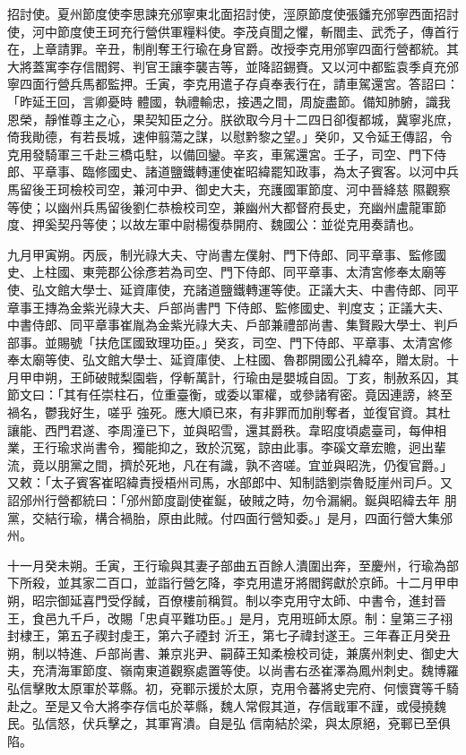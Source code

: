 \begin{pinyinscope}
 招討使。夏州節度使李思諫充邠寧東北面招討使，涇原節度使張鐇充邠寧西面招討使，河中節度使王珂充行營供軍糧料使。李茂貞聞之懼，斬閻圭、武禿子，傳首行在，上章請罪。辛丑，制削奪王行瑜在身官爵。改授李克用邠寧四面行營都統。其大將蓋寓李存信閻鍔、判官王讓李襲吉等，並降詔錫賚。又以河中都監袁季貞充邠寧四面行營兵馬都監押。壬寅，李克用遣子存貞奉表行在，請車駕還宮。答詔曰：「昨延王回，言卿憂時
 體國，執禮輸忠，接遇之間，周旋盡節。備知肺腑，識我恩榮，靜惟尊主之心，果契知臣之分。朕欲取今月十二四日卻復都城，冀寧兆庶，倚我勛德，有若長城，速伸翦蕩之謀，以慰黔黎之望。」癸卯，又令延王傳詔，令克用發騎軍三千赴三橋屯駐，以備回鑾。辛亥，車駕還宮。壬子，司空、門下侍郎、平章事、臨修國史、諸道鹽鐵轉運使崔昭緯罷知政事，為太子賓客。以河中兵馬留後王珂檢校司空，兼河中尹、御史大夫，充護國軍節度、河中晉絳慈
 隰觀察等使；以幽州兵馬留後劉仁恭檢校司空，兼幽州大都督府長史，充幽州盧龍軍節度、押奚契丹等使；以故左軍中尉楊復恭開府、魏國公：並從克用奏請也。



 九月甲寅朔。丙辰，制光祿大夫、守尚書左僕射、門下侍郎、同平章事、監修國史、上柱國、東莞郡公徐彥若為司空、門下侍郎、同平章事、太清宮修奉太廟等使、弘文館大學士、延資庫使，充諸道鹽鐵轉運等使。正議大夫、中書侍郎、同平章事王摶為金紫光祿大夫、戶部尚書門
 下侍郎、監修國史、判度支；正議大夫、中書侍郎、同平章事崔胤為金紫光祿大夫、戶部兼禮部尚書、集賢殿大學士、判戶部事。並賜號「扶危匡國致理功臣。」癸亥，司空、門下侍郎、平章事、太清宮修奉太廟等使、弘文館大學士、延資庫使、上柱國、魯郡開國公孔緯卒，贈太尉。十月甲申朔，王師破賊梨園砦，俘斬萬計，行瑜由是嬰城自固。丁亥，制赦系囚，其節文曰：「其有任崇柱石，位重臺衡，或委以軍權，或參諸宥密。竟因連謗，終至禍名，鬱我好生，嗟乎
 強死。應大順已來，有非罪而加削奪者，並復官資。其杜讓能、西門君遂、李周潼已下，並與昭雪，還其爵秩。韋昭度頃處臺司，每伸相業，王行瑜求尚書令，獨能抑之，致於沉冤，諒由此事。李磎文章宏贍，迥出輩流，竟以朋黨之間，擠於死地，凡在有識，孰不咨嗟。宜並與昭洗，仍復官爵。」又敕：「太子賓客崔昭緯責授梧州司馬，水部郎中、知制誥劉崇魯貶崖州司戶。又詔邠州行營都統曰：「邠州節度副使崔鋋，破賊之時，勿令漏網。鋋與昭緯去年
 朋黨，交結行瑜，構合禍胎，原由此賊。付四面行營知委。」是月，四面行營大集邠州。



 十一月癸未朔。壬寅，王行瑜與其妻子部曲五百餘人潰圍出奔，至慶州，行瑜為部下所殺，並其家二百口，並詣行營乞降，李克用遣牙將閻鍔獻於京師。十二月甲申朔，昭宗御延喜門受俘馘，百僚樓前稱賀。制以李克用守太師、中書令，進封晉王，食邑九千戶，改賜「忠貞平難功臣。」是月，克用班師太原。制：皇第三子祤封棣王，第五子禊封虔王，第六子禋封
 沂王，第七子禕封遂王。三年春正月癸丑朔，制以特進、戶部尚書、兼京兆尹、嗣薛王知柔檢校司徒，兼廣州刺史、御史大夫，充清海軍節度、嶺南東道觀察處置等使。以尚書右丞崔澤為鳳州刺史。魏博羅弘信擊敗太原軍於莘縣。初，兗鄆示援於太原，克用令蕃將史完府、何懷寶等千騎赴之。至是又令大將李存信屯於莘縣，魏人常假其道，存信戢軍不謹，或侵撓魏民。弘信怒，伏兵擊之，其軍宵潰。自是弘
 信南結於梁，與太原絕，兗鄆已至俱陷。




\end{pinyinscope}
